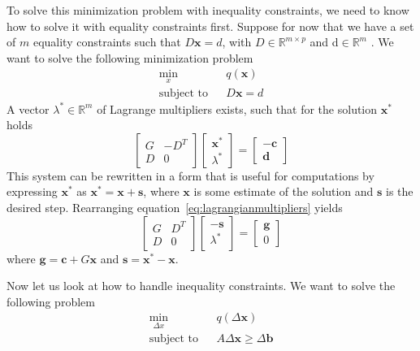 To solve this minimization problem with inequality constraints, we need to know
how to solve it with equality constraints first. Suppose for now that we have a
set of $m$ equality constraints such that $D\mathbf{x} = d$, with
$D \in \mathbb{R}^{m \times p}$ and d$ \in \mathbb{R}^m$ . We want to solve the following minimization problem
\begin{eqnarray}
\min_{x} & & q(\mathbf{x})\nonumber \\
\textrm{subject to} & & D\mathbf{x} = d
\end{eqnarray}
A vector $\lambda^\ast \in \mathbb{R}^m$ of Lagrange multipliers exists, such
that for the solution $\mathbf{x}^\ast$ holds
\begin{equation}\label{eq:lagrangianmultipliers}
\left[ \begin{array}{cc} G & -D^T \\ D & 0 \end{array} \right]
\left[ \begin{array}{c} \mathbf{x}^\ast \\ \lambda^\ast \end{array}\right]
= \left[ \begin{array}{c} -\mathbf{c} \\ \mathbf{d} \end{array}\right]
\end{equation}
This system can be rewritten in a form that is useful for computations by
expressing $\mathbf{x}^\ast$ as $\mathbf{x}^\ast = \mathbf{x} + \mathbf{s}$,
where $\mathbf{x}$ is some estimate of the solution and $\mathbf{s}$ is the
desired step. Rearranging equation~\ref{eq:lagrangianmultipliers} yields
\begin{equation}
\left[ \begin{array}{cc} G & D^T \\ D & 0 \end{array} \right]
\left[ \begin{array}{c} - \mathbf{s} \\ \lambda^\ast \end{array}\right]
= \left[ \begin{array}{c} \mathbf{g} \\ 0 \end{array}\right]
\end{equation}
where $\mathbf{g} = \mathbf{c} + G\mathbf{x}$ and $\mathbf{s} =
\mathbf{x}^\ast - \mathbf{x}$.

Now let us look at how to handle inequality constraints. We want to solve the
following problem
\begin{eqnarray}\label{eq:constrainedproblem}
\min_{\Delta x} & & q(\Delta \mathbf{x})\nonumber \\
\textrm{subject to} & & A \Delta \mathbf{x} \geq \Delta \mathbf{b}
\end{eqnarray}

